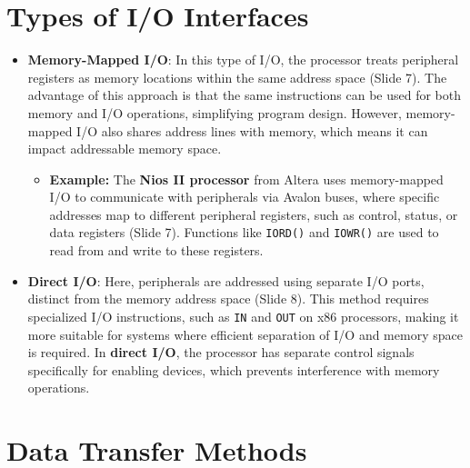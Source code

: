 \documentclass[
  14pt,
  a4paper,
  numbers=noendperiod,
  headinclude=true,
  footinclude=true,
  DIV=calc]{scrreprt}
\providecommand{\tightlist}{%
  \setlength{\itemsep}{0pt}\setlength{\parskip}{0pt}}\usepackage{longtable,booktabs,array}
\begin{document}
\section{Types of I/O Interfaces}\label{types-of-io-interfaces}

\begin{itemize}
\item
  \textbf{Memory-Mapped I/O}: In this type of I/O, the processor treats
  peripheral registers as memory locations within the same address space
  (Slide 7). The advantage of this approach is that the same
  instructions can be used for both memory and I/O operations,
  simplifying program design. However, memory-mapped I/O also shares
  address lines with memory, which means it can impact addressable
  memory space.

  \begin{itemize}
  \tightlist
  \item
    \textbf{Example:} The \textbf{Nios II processor} from Altera uses
    memory-mapped I/O to communicate with peripherals via Avalon buses,
    where specific addresses map to different peripheral registers, such
    as control, status, or data registers (Slide 7). Functions like
    \texttt{IORD()} and \texttt{IOWR()} are used to read from and write
    to these registers.
  \end{itemize}
\item
  \textbf{Direct I/O}: Here, peripherals are addressed using separate
  I/O ports, distinct from the memory address space (Slide 8). This
  method requires specialized I/O instructions, such as \texttt{IN} and
  \texttt{OUT} on x86 processors, making it more suitable for systems
  where efficient separation of I/O and memory space is required. In
  \textbf{direct I/O}, the processor has separate control signals
  specifically for enabling devices, which prevents interference with
  memory operations.
\end{itemize}

\section{Data Transfer Methods}\label{data-transfer-methods}
\end{document}
